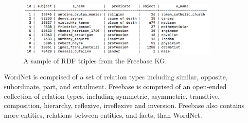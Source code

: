 \bigskip
\bigskip
\bigskip
\bigskip

\begin{figure}[H]
   	\centering
    	\includegraphics[width=0.9\textwidth, height=0.2\textwidth]{freebase_fact_sample}
	\captionsetup{justification=centering}
	\caption{A sample of RDF triples from the Freebase KG.}
\end{figure}

\noindent WordNet is comprised of a set of relation types including similar, opposite, subordinate, part, and entailment. Freebase is comprised of an open-ended collection of relation types, including symmetric, asymmetric, transitive, composition, hierarchy, reflexive, irreflexive and inversion. Freebase also contains more entities, relations between entities, and facts, than WordNet. 



